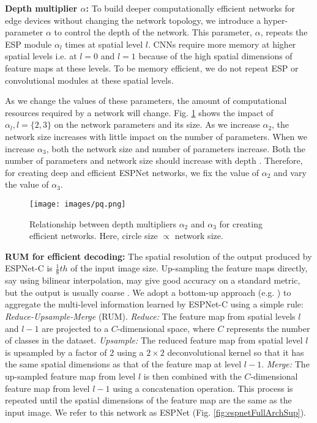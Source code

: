 \documentclass[runningheads]{llncs}
\def\Fig{Fig. }
\begin{document}
\noindent \textbf{Depth multiplier $\alpha$:} To build deeper computationally efficient networks for edge devices without changing the network topology, we introduce a hyper-parameter $\alpha$ to control the depth of the network. This parameter, $\alpha$, repeats the ESP module $\alpha_l$ times at spatial level $l$. CNNs require more memory at higher spatial levels i.e. at $l=0$ and $l=1$ because of the high spatial dimensions of feature maps at these levels. To be memory efficient, we do not repeat ESP or convolutional modules at these spatial levels.

As we change the values of these parameters, the amount of computational resources required by a network will change. \Fig \ref{fig:resourceReqSup} shows the impact of $\alpha_l, l=\{2, 3\}$  on the network parameters and its size. As we increase $\alpha_2$, the network size increases with little impact on the number of parameters. When we increase $\alpha_3$, both the network size and number of parameters increase. Both the number of parameters and network size should increase with depth \cite{he2016deep,xie2017aggregated,SzegedyIV16InceptionV4}. Therefore, for creating deep and efficient ESPNet networks, we fix the value of $\alpha_2$ and vary the value of $\alpha_3$.

\begin{figure}[t!]
\centering
\texttt{[image: images/pq.png]}
\caption{Relationship between depth multipliers $\alpha_2$ and $\alpha_3$ for creating efficient networks. Here, circle size $\propto$ network size.}
\label{fig:resourceReqSup}
\end{figure}

\noindent \textbf{RUM for efficient decoding:} The spatial resolution of the output produced by ESPNet-C is $\frac{1}{8}{th}$ of the input image size. Up-sampling the feature maps directly, say using bilinear interpolation, may give good accuracy  on a standard metric, but the output is usually coarse \cite{long2015fully}. We adopt a bottom-up approach (e.g. \cite{badrinarayanan2017segnet,ronneberger2015u}) to aggregate the multi-level information learned by ESPNet-C using a simple rule: \textit{Reduce-Upsample-Merge} (RUM). \textit{Reduce:} The feature map from spatial levels $l$ and $l-1$ are projected to a $C$-dimensional space, where $C$ represents the number of classes in the dataset. \textit{Upsample:} The reduced feature map from spatial level $l$ is upsampled by a factor of $2$ using a $2\times2$ deconvolutional kernel so that it has the same spatial dimensions as that of the feature map at level $l-1$. \textit{Merge:} The up-sampled feature map from level $l$ is then combined with the $C$-dimensional feature map from level $l-1$ using a concatenation operation. This process is repeated until the spatial dimensions of the feature map are the same as the input image. We refer to this network as ESPNet (\Fig \ref{fig:espnetFullArchSup}).
\end{document}
